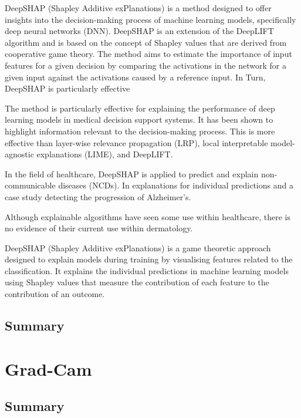 DeepSHAP (Shapley Additive exPlanations) is a method designed to offer insights into the decision-making process of machine learning models, specifically deep neural networks (DNN). DeepSHAP is an extension of the DeepLIFT algorithm and is based on the concept of Shapley values that are derived from cooperative game theory. The method aims to estimate the importance of input features for a given decision by comparing the activations in the network for a given input against the activations caused by a reference input. In Turn, DeepSHAP is particularly effective

The method is particularly effective for explaining the performance of deep learning models in medical decision support systems\cite{}. It has been shown to highlight information relevant to the decision-making process. This is more effective than layer-wise relevance propagation (LRP), local interpretable model-agnostic explanations (LIME), and DeepLIFT.

In the field of healthcare, DeepSHAP is applied to predict and explain non-communicable diseases (NCDs). In explanations for individual predictions and a case study detecting the progression of Alzheimer's. 

Although explainable algorithms have seen some use within healthcare, there is no evidence of their current use within dermatology.

DeepSHAP (Shapley Additive exPlanations) is a game theoretic approach designed to explain models during training by visualising features related to the classification. It explains the individual predictions in machine learning models using Shapley values that measure the contribution of each feature to the contribution of an outcome\cite{Aas2021}.



\subsection{Summary}

\section{Grad-Cam}




\subsection{Summary}


